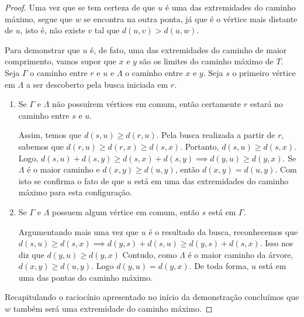 \documentclass{homework}
\begin{document}
	\begin{fig}
		
	\end{fig}

	\begin{proof}
		 Uma vez que se tem certeza de que $u$ é uma das extremidades do caminho máximo, segue que $w$ se encontra na outra ponta, já que é o vértice mais distante de $u$, isto é, não existe $v$ tal que $d(u, v) > d(u, w)$.\par
		 
		 Para demonstrar que $u$ é, de fato, uma das extremidades do caminho de maior comprimento, vamos supor que $x$ e $y$ são os limites do caminho máximo de $T$. Seja $\Gamma$ o caminho entre $r$ e $u$ e $\Lambda$ o caminho entre $x$ e $y$. Seja $s$ o primeiro vértice em $\Lambda$ a ser descoberto pela busca iniciada em $r$.\par
		 
		 \begin{enumerate}[label=\Roman*.:]
		 	\item Se $\Gamma$ e $\Lambda$ não possuírem vértices em comum, então certamente $r$ estará no caminho entre $s$ e $u$.
		 		\begin{fig}
		 			
		 		\end{fig}
	 		Assim, temos que $d(s, u) \ge d(r, u)$. Pela busca realizada a partir de $r$, sabemos que $d(r, u) \ge d(r, x) \ge d(s, x)$. Portanto, $d(s, u) \ge d(s, x)$. Logo, $d(s, u) + d(s, y) \ge d(s, x) + d(s, y) \implies d(y, u) \ge d(y, x)$. Se $\Lambda$ é o maior caminho e $d(x, y) \ge d(u, y)$, então $d(x, y) = d(u, y)$. Com isto se confirma o fato de que $u$ está em uma das extremidades do caminho máximo para esta configuração.
		 	
		 	\item Se $\Gamma$ e $\Lambda$ possuem algum vértice em comum, então $s$ está em $\Gamma$. 
			 	\begin{fig}
			 		
			 	\end{fig}
		 	Argumentando mais uma vez que $u$ é o resultado da busca, reconhecemos que $d(s, u) \ge d(s, x) \implies d(y, s) + d(s, u) \ge d(y, s) + d(s, x)$. Isso nos diz que $d(y, u) \ge d(y, x)$ Contudo, como $\Lambda$ é o maior caminho da árvore, $d(x, y) \ge d(u, y)$. Logo $d(y, u) = d(y, x)$. De toda forma, $u$ está em uma das pontas do caminho máximo.
		 \end{enumerate}

	Recapitulando o raciocínio apresentado no início da demonstração concluímos que $w$ também será uma extremidade do caminho máximo.
	\end{proof}
	
\end{document}
